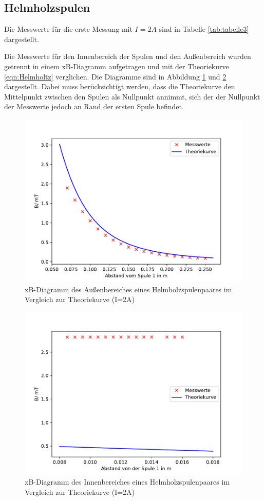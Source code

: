 \subsection{Helmholzspulen}
\noindent Die Messwerte für die erste Messung mit $I=2A$
sind in Tabelle \ref{tab:tabelle3} dargestellt.

Die Messwerte für den Innenbereich der Spulen und den
Außenbereich wurden getrennt in einem xB-Diagramm
aufgetragen und mit der Theoriekurve \ref{eqn:Helmholtz}
verglichen. Die Diagramme sind in Abbildung
\ref{fig:Helmholz1} und \ref{fig:Helmholz1I}
dargestellt. Dabei muss berücksichtigt werden, dass die
Theoriekurve den Mittelpunkt zwischen den Spulen als
Nullpunkt annimmt, sich der der Nullpunkt der
Messwerte jedoch an Rand der ersten Spule befindet.
\begin{figure}[H]
  \centering
  \includegraphics{Helmholz1.pdf}
  \caption{xB-Diagramm des Außenbereiches eines
  Helmholzspulenpaares im Vergleich zur Theoriekurve
  (I=2A)}
  \label{fig:Helmholz1}
\end{figure}
\begin{figure}[H]
  \centering
  \includegraphics{Helmholz1I.pdf}
  \caption{xB-Diagramm des Innenbereiches eines
  Helmholzspulenpaares im Vergleich zur Theoriekurve
  (I=2A)}
  \label{fig:Helmholz1I}
\end{figure}

